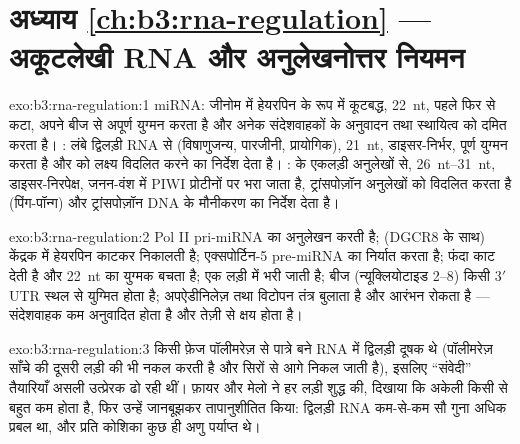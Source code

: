 \section*{अध्याय \ref{ch:b3:rna-regulation} --- अकूटलेखी RNA और अनुलेखनोत्तर नियमन}

\begin{solution}{exo:b3:rna-regulation:1}
miRNA: जीनोम में हेयरपिन के रूप में कूटबद्ध, \qty{22}{nt}, पहले 
फिर  से कटा, अपने बीज से अपूर्ण युग्मन करता है और अनेक
संदेशवाहकों के अनुवादन तथा स्थायित्व को दमित करता है। : लंबे
द्विलड़ी RNA से (विषाणुजन्य, पारजीनी, प्रायोगिक), \qty{21}{nt},
डाइसर-निर्भर, पूर्ण युग्मन करता है और  को लक्ष्य विदलित करने
का निर्देश देता है। :  के एकलड़ी अनुलेखों से,
\qtyrange{26}{31}{nt}, डाइसर-निरपेक्ष, जनन-वंश में PIWI प्रोटीनों पर
भरा जाता है, ट्रांसपोज़ॉन अनुलेखों को विदलित करता है (पिंग-पॉन्ग) और
ट्रांसपोज़ॉन DNA के  मौनीकरण का निर्देश देता है।
\end{solution}

\begin{solution}{exo:b3:rna-regulation:2}
Pol II pri-miRNA का अनुलेखन करती है;  (DGCR8 के साथ) केंद्रक में
हेयरपिन काटकर निकालती है; एक्सपोर्टिन-5 pre-miRNA का निर्यात करता है;
 फंदा काट देती है और \qty{22}{nt} का युग्मक बचता है; एक लड़ी
 में भरी जाती है; बीज (न्यूक्लियोटाइड 2--8) किसी 3$'$ UTR स्थल
से युग्मित होता है;  अपऐडीनिलेज़ तथा विटोपन तंत्र बुलाता है और
आरंभन रोकता है --- संदेशवाहक कम अनुवादित होता है और तेज़ी से क्षय होता है।
\end{solution}

\begin{solution}{exo:b3:rna-regulation:3}
किसी फ़ेज पॉलीमरेज़ से पात्रे बने RNA में द्विलड़ी दूषक थे (पॉलीमरेज़
साँचे की दूसरी लड़ी की भी नकल करती है और सिरों से आगे निकल जाती है),
इसलिए ``संवेदी'' तैयारियाँ असली उत्प्रेरक ढो रही थीं। फ़ायर और मेलो ने
हर लड़ी शुद्ध की, दिखाया कि अकेली किसी से बहुत कम होता है, फिर उन्हें
जानबूझकर तापानुशीतित किया: द्विलड़ी RNA कम-से-कम सौ गुना अधिक प्रबल था,
और प्रति कोशिका कुछ ही अणु पर्याप्त थे।
\end{solution}

